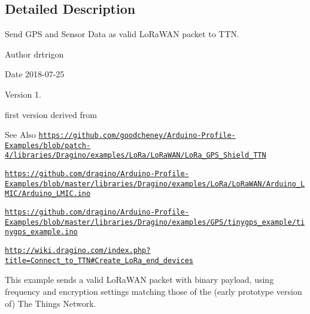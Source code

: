 \subsection{Detailed Description}
Send G\-P\-S and Sensor Data as valid Lo\-Ra\-W\-A\-N packet to T\-T\-N. \begin{DoxyAuthor}{Author}
drtrigon 
\end{DoxyAuthor}
\begin{DoxyDate}{Date}
2018-\/07-\/25 
\end{DoxyDate}
\begin{DoxyVersion}{Version}
1. \begin{DoxyItemize}
\item first version derived from \end{DoxyItemize}

\end{DoxyVersion}
\begin{DoxySeeAlso}{See Also}
\href{https://github.com/goodcheney/Arduino-Profile-Examples/blob/patch-4/libraries/Dragino/examples/LoRa/LoRaWAN/LoRa_GPS_Shield_TTN}{\tt https\-://github.\-com/goodcheney/\-Arduino-\/\-Profile-\/\-Examples/blob/patch-\/4/libraries/\-Dragino/examples/\-Lo\-Ra/\-Lo\-Ra\-W\-A\-N/\-Lo\-Ra\-\_\-\-G\-P\-S\-\_\-\-Shield\-\_\-\-T\-T\-N} 

\href{https://github.com/dragino/Arduino-Profile-Examples/blob/master/libraries/Dragino/examples/LoRa/LoRaWAN/Arduino_LMIC/Arduino_LMIC.ino}{\tt https\-://github.\-com/dragino/\-Arduino-\/\-Profile-\/\-Examples/blob/master/libraries/\-Dragino/examples/\-Lo\-Ra/\-Lo\-Ra\-W\-A\-N/\-Arduino\-\_\-\-L\-M\-I\-C/\-Arduino\-\_\-\-L\-M\-I\-C.\-ino} 

\href{https://github.com/dragino/Arduino-Profile-Examples/blob/master/libraries/Dragino/examples/GPS/tinygps_example/tinygps_example.ino}{\tt https\-://github.\-com/dragino/\-Arduino-\/\-Profile-\/\-Examples/blob/master/libraries/\-Dragino/examples/\-G\-P\-S/tinygps\-\_\-example/tinygps\-\_\-example.\-ino} 

\href{http://wiki.dragino.com/index.php?title=Connect_to_TTN#Create_LoRa_end_devices}{\tt http\-://wiki.\-dragino.\-com/index.\-php?title=\-Connect\-\_\-to\-\_\-\-T\-T\-N\#\-Create\-\_\-\-Lo\-Ra\-\_\-end\-\_\-devices}
\end{DoxySeeAlso}
This example sends a valid Lo\-Ra\-W\-A\-N packet with binary payload, using frequency and encryption settings matching those of the (early prototype version of) The Things Network.

